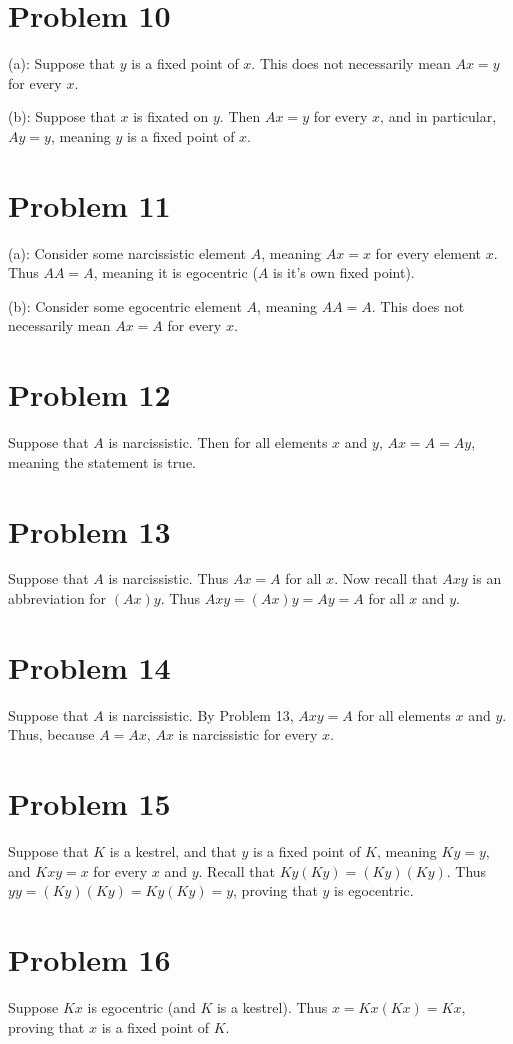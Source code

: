 \documentclass{article}
\theoremstyle{definition}
\begin{document}
\section*{Problem 10}
(a): Suppose that $y$ is a fixed point of $x$. This does not necessarily mean $Ax=y$ for every $x$.


(b): Suppose that $x$ is fixated on $y$. Then $Ax=y$ for every $x$, and in particular, $Ay=y$, meaning $y$ is a fixed point of $x$.

\section*{Problem 11}
(a): Consider some narcissistic element $A$, meaning $Ax=x$ for every element $x$. Thus $AA=A$, meaning it is egocentric ($A$ is it's own fixed point).


(b): Consider some egocentric element $A$, meaning $AA=A$. This does not necessarily mean $Ax=A$ for every $x$.

\section*{Problem 12}
Suppose that $A$ is narcissistic. Then for all elements $x$ and $y$, $Ax=A=Ay$, meaning the statement is true.

\section*{Problem 13}
Suppose that $A$ is narcissistic. Thus $Ax=A$ for all $x$. Now recall that $Axy$ is an abbreviation for $(Ax)y$. Thus $Axy=(Ax)y=Ay=A$ for all $x$ and $y$.

\section*{Problem 14}
Suppose that $A$ is narcissistic. By Problem 13, $Axy=A$ for all elements $x$ and $y$. Thus, because $A=Ax$, $Ax$ is narcissistic for every $x$. 

\section*{Problem 15}
Suppose that $K$ is a kestrel, and that $y$ is a fixed point of $K$, meaning $Ky=y$, and $Kxy=x$ for every $x$ and $y$. Recall that $Ky(Ky)=(Ky)(Ky)$. 
Thus $yy=(Ky)(Ky)=Ky(Ky)=y$, proving that $y$ is egocentric.

\section*{Problem 16}
Suppose $Kx$ is egocentric (and $K$ is a kestrel). Thus $x=Kx(Kx)=Kx$, proving that $x$ is a fixed point of $K$.
\end{document}

